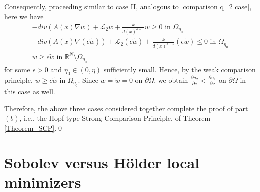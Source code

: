 \documentclass[reqno,oneside]{amsart}
\theoremstyle{definition}
\theoremstyle{remark}
\numberwithin{equation}{section}
\newcommand{\Om} {\Omega}
\newcommand{\sr}{\mathbb{R}}
\newcommand{\pa}{\partial}
\newcommand{\na} {\nabla}
\begin{document}
Consequently, proceeding similar to case II, analogous to \eqref{comparison q=2 case}, here we have
\begin{equation}\label{comparison general case}
    \begin{aligned}
        -div \left(A(x)\na w \right) + \mathcal{L}_2 w + \frac{k}{d(x)^{\delta +1}} w \geq 0 \text{ in } \Om_{\eta_0}\\
        -div \left(A(x)\na \left(\epsilon \tilde{w} \right) \right) + \mathcal{L}_2 \left(\epsilon \tilde{w} \right) + \frac{k}{d(x)^{\delta +1}} \left(\epsilon \tilde{w} \right) \leq 0 \text{ in } \Om_{\eta_0}\\
        w \geq \epsilon \tilde{w} \text{ in } \sr^N \setminus \Om_{\eta_0}
    \end{aligned}
\end{equation}
for some $\epsilon>0$ and $\eta_0 \in (0, \eta)$ sufficiently small. Hence, by the weak comparison principle, $w \geq \epsilon \tilde{w}$ in $\Om_{\eta_0}$. Since $w= \tilde{w}=0$ on $\pa\Om$, we obtain $\frac{\pa u_2}{\pa \nu} < \frac{\pa u_1}{\pa \nu}$ on $\pa\Om$ in this case as well.

Therefore, the above three cases considered together complete the proof of part $(b)$, i.e., the Hopf-type Strong Comparison Principle, of Theorem \ref{Theorem_SCP}.\hfill\qed


\section{Sobolev versus H\"older local minimizers}\label{section_minimizer}
\end{document}
